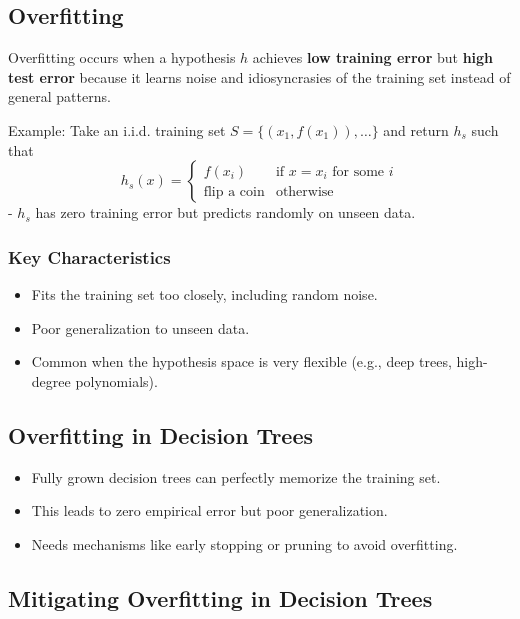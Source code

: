 \subsection*{Overfitting}

Overfitting occurs when a hypothesis $h$ achieves \textbf{low training error} but \textbf{high test error} because it learns noise and idiosyncrasies of the training set instead of general patterns.

Example:
Take an i.i.d. training set $S = \{(x_1, f(x_1)), \dots\}$ and return $h_s$ such that 
$$h_s(x) = \begin{cases} f(x_i) & \text{if } x = x_i \text{ for some }i \\ \text{flip a coin} & \text{otherwise} \end{cases}$$
- $h_s$ has zero training error but predicts randomly on unseen data.

\subsubsection*{Key Characteristics}
\begin{itemize}
    \item Fits the training set too closely, including random noise.
    \item Poor generalization to unseen data.
    \item Common when the hypothesis space is very flexible (e.g., deep trees, high-degree polynomials).
\end{itemize}

\subsection*{Overfitting in Decision Trees}
\begin{itemize}
    \item Fully grown decision trees can perfectly memorize the training set.
    \item This leads to zero empirical error but poor generalization.
    \item Needs mechanisms like early stopping or pruning to avoid overfitting.
\end{itemize}

\subsection*{Mitigating Overfitting in Decision Trees}

